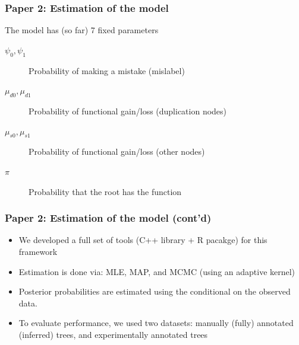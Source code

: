 \documentclass[aspectratio=169, 10pt]{beamer}\usepackage[]{graphicx}\usepackage[]{color}
\begin{document}
\begin{frame}
\frametitle{Paper 2: Estimation of the model}
The model has (so far) 7 fixed parameters
\begin{description}
\item[$\psi_0, \psi_1$] Probability of making a mistake (mislabel)
\item[$\mu_{d0}, \mu_{d1}$] Probability of functional gain/loss (duplication nodes)
\item[$\mu_{s0}, \mu_{s1}$] Probability of functional gain/loss (other nodes)
\item[$\pi$] Probability that the root has the function
\end{description}
\end{frame}

\begin{frame}[label=aphylo]
\frametitle{Paper 2: Estimation of the model (cont'd)}
\begin{itemize}
\item We developed a full set of tools (C++ library + R pacakge) for this framework
\hyperlink{aphylopkg}{}
\item Estimation is done via: MLE, MAP, and MCMC (using an adaptive kernel)
\item Posterior probabilities are estimated using the conditional on the observed data.
\item To evaluate performance, we used two datasets: manually (fully) annotated (inferred) trees, and experimentally annotated trees
\end{itemize}
\end{frame}
\end{document}
